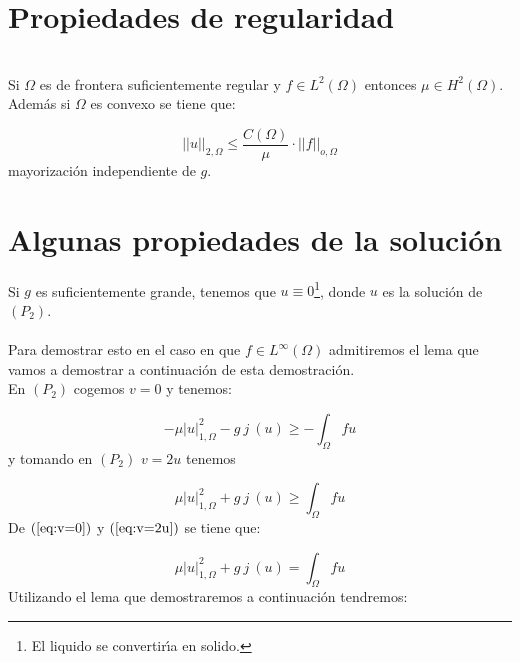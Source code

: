 \newpage

\section{Propiedades de regularidad}

\begin{teorema}[Brezis]
\ \\
Si $\Omega $ es de frontera suficientemente regular y $f \in L^2(\Omega )$
entonces $\mu \in H^2(\Omega )$.\\

Adem\'as si $\Omega $ es convexo se tiene que:

\begin{displaymath}
||u||_{2,\Omega }\le \frac{C(\Omega )}{\mu}\cdot ||f||_{o,\Omega }
\end{displaymath}
mayorizaci\'on independiente de $g$.
\end{teorema}

\section{Algunas propiedades de la soluci\'on}

Si $g$ es suficientemente grande, tenemos que $u\equiv 0$\footnote{El liquido
se convertir\'{\i}a en solido.}, donde $u$ es la soluci\'on de $(P_2)$.\\ \\
Para demostrar esto en el caso en que $f\in L^\infty (\Omega )$ admitiremos el
lema que vamos a demostrar a continuaci\'on de esta demostraci\'on.\\

En $(P_2)$ cogemos $v=0$ y tenemos:

\begin{equation}\label{eq:v=0}
-\mu |u|^2_{1,\Omega }-g\ j\ (u)\ge - \int_{\Omega } fu
\end{equation}
y tomando en $(P_2)$ $v=2u$ tenemos

\begin{equation} \label{eq:v=2u}
\mu |u|^2_{1,\Omega }+g\ j\ (u)\ge \int_{\Omega } fu
\end{equation}
De $(\ref{eq:v=0})$ y $(\ref{eq:v=2u})$ se tiene que:

\begin{equation} \label{eq:util}
\mu |u|^2_{1,\Omega }+g\ j\ (u) =\int_{\Omega }fu
\end{equation}
Utilizando el lema que demostraremos a continuaci\'on tendremos:

